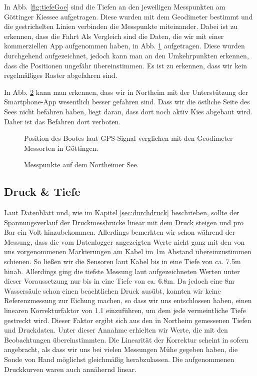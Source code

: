\documentclass[12pt,a4paper,titlepage,headinclude,bibtotoc]{scrartcl}
\numberwithin{equation}{subsection}
\begin{document}
In Abb. \ref{fig:tiefeGoe} sind die Tiefen an den jeweiligen Messpunkten am Göttinger Kiessee aufgetragen.
Diese wurden mit dem Geodimeter bestimmt und die gestrichelten Linien verbinden die Messpunkte miteinander.
Dabei ist zu erkennen, dass die Fahrt
Als Vergleich sind die Daten, die wir mit einer kommerziellen App aufgenommen haben, in Abb. \ref{fig:GPSGoe} aufgetragen.
Diese wurden durchgehend aufgezeichnet, jedoch kann man an den Umkehrpunkten erkennen, dass die Positionen ungefähr übereinstimmen.
Es ist zu erkennen, dass wir kein regelmäßiges Raster abgefahren sind.

In Abb. \ref{fig:GPSNort} kann man erkennen, dass wir in Northeim mit der Unterstützung der Smart\-phone-App wesentlich besser gefahren sind.
Dass wir die östliche Seite des Sees nicht befahren haben, liegt daran, dass dort noch aktiv Kies abgebaut wird.
Daher ist das Befahren dort verboten.

%
\begin{figure}[!h]
\centering

\caption{Position des Bootes laut GPS-Signal verglichen mit den Geodimeter Messorten in Göttingen.}
\label{fig:GPSGoe}
\end{figure}

\begin{figure}[!h]
	\centering
	
	\caption{Messpunkte auf dem Northeimer See.}
	\label{fig:GPSNort}
\end{figure}

\subsection{Druck \& Tiefe}
\label{sec:ausdruck}
Laut Datenblatt und, wie im Kapitel \ref{sec:durchdruck} beschrieben, sollte der Spannungsverlauf der Druckmessbrücke linear mit dem Druck steigen und pro Bar ein Volt hinzubekommen.
Allerdings bemerkten wir schon während der Messung, dass die vom Datenlogger angezeigten Werte nicht ganz mit den von uns vorgenommenen Markierungen am Kabel im 1m Abstand übereinzustimmen schienen.
So ließen wir die Sensoren laut Kabel bis in eine Tiefe von ca. 7.5m hinab.
Allerdings ging die tiefste Messung laut aufgezeichneten Werten unter dieser Voraussetzung nur bis in eine Tiefe von ca. 6.8m.
Da jedoch eine 8m Wassersäule schon einen beachtlichen Druck ausübt, konnten wir keine Referenzmessung zur Eichung machen, so dass wir uns entschlossen haben, einen linearen Korrekturfaktor von 1.1 einzuführen, um dem jede vermeintliche Tiefe gestreckt wird.
Dieser Faktor ergibt sich aus den in Northeim gemessenen Tiefen und Druckdaten.
Unter dieser Annahme erhielten wir Werte, die mit den Beobachtungen übereinstimmten.
Die Linearität der Korrektur scheint in sofern angebracht, als dass wir uns bei vielen Messungen Mühe gegeben haben, die Sonde von Hand möglichst gleichmäßig herabzulassen.
Die aufgenommenen Druckkurven waren auch annähernd linear.
\end{document}
